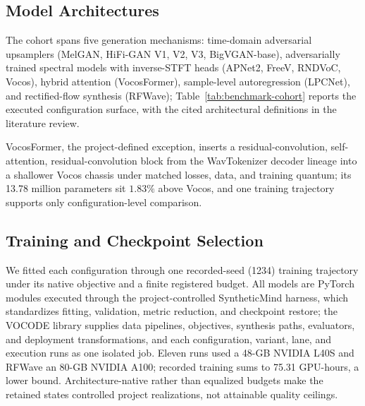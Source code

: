 \subsection{Model Architectures}
\label{sec:model-architectures}

The cohort spans five generation mechanisms: time-domain adversarial
upsamplers (MelGAN, HiFi-GAN V1, V2, V3, BigVGAN-base), adversarially
trained spectral models with inverse-STFT heads (APNet2, FreeV, RNDVoC,
Vocos), hybrid attention (VocosFormer), sample-level autoregression
(LPCNet), and rectified-flow synthesis (RFWave);
Table~\ref{tab:benchmark-cohort} reports the executed configuration surface,
with the cited architectural definitions in the literature review.

\begin{table}[t]
  \centering
  \footnotesize
  \renewcommand{\arraystretch}{1.02}
  \setlength{\tabcolsep}{4pt}
  \caption{Project-Trained Configurations.  Conditioning: input features and
  rate (kHz); Params: deployable parameters (millions); Segment: training
  crop (samples); Updates: executed budget (thousands); State: the Retained
  Project Checkpoint, the terminal durable state selected by the
  registered gate.}
  \label{tab:benchmark-cohort}
\end{table}

VocosFormer, the project-defined exception, inserts a residual-convolution,
self-attention, residual-convolution block from the WavTokenizer decoder
lineage into a shallower Vocos chassis under matched losses, data, and
training quantum; its 13.78 million parameters sit $1.83\%$ above Vocos,
and one training trajectory supports only configuration-level comparison.

\subsection{Training and Checkpoint Selection}
\label{sec:training-checkpoint}

We fitted each configuration through one recorded-seed (1234) training
trajectory under its native objective and a finite registered budget.  All
models are PyTorch modules executed through the project-controlled
SyntheticMind harness, which standardizes fitting, validation, metric
reduction, and checkpoint restore; the VOCODE library
supplies data pipelines, objectives, synthesis paths, evaluators, and
deployment transformations, and each configuration, variant, lane, and
execution runs as one isolated job.
Eleven runs used a 48-GB NVIDIA L40S and RFWave an 80-GB NVIDIA A100;
recorded training sums to 75.31 GPU-hours, a lower bound.
Architecture-native rather than equalized budgets make the retained states
controlled project realizations, not attainable quality ceilings.

